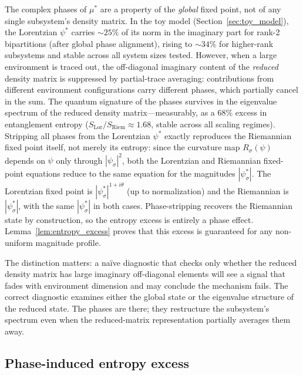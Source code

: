 \documentclass[12pt,a4paper]{article}
\theoremstyle{definition}
\theoremstyle{remark}
\begin{document}
The complex phases of $\mu^*$ are a property of the \emph{global}
fixed point, not of any single subsystem's density matrix. In the toy
model (Section~\ref{sec:toy_model}), the Lorentzian $\psi^*$ carries
$\sim 25\%$ of its norm in the imaginary part for rank-2 bipartitions
(after global phase alignment), rising to $\sim 34\%$ for higher-rank
subsystems and stable across all system sizes tested. However, when a
large environment is traced out, the off-diagonal imaginary content of
the \emph{reduced} density matrix is suppressed by partial-trace
averaging: contributions from different environment configurations
carry different phases, which partially cancel in the sum. The quantum
signature of the phases survives in the eigenvalue spectrum of the
reduced density matrix---measurably, as a $68\%$ excess in entanglement
entropy ($S_{\mathrm{Lor}} / S_{\mathrm{Riem}} \approx 1.68$, stable
across all scaling regimes). Stripping all phases from the Lorentzian
$\psi^*$ exactly reproduces the Riemannian fixed point itself, not
merely its entropy: since the curvature map $R_\sigma(\psi)$ depends
on $\psi$ only through $|\psi_\sigma|^2$, both the Lorentzian and
Riemannian fixed-point equations reduce to the same equation for the
magnitudes $|\psi^*_\sigma|$. The Lorentzian fixed point is
$|\psi^*_\sigma|^{1+i\theta}$ (up to normalization) and the Riemannian
is $|\psi^*_\sigma|$, with the same $|\psi^*_\sigma|$ in both cases.
Phase-stripping recovers the Riemannian state by construction, so the
entropy excess is entirely a phase effect.
Lemma~\ref{lem:entropy_excess} proves that this excess is guaranteed
for any non-uniform magnitude profile.

The distinction matters: a na\"ive diagnostic that checks only whether
the reduced density matrix has large imaginary off-diagonal elements
will see a signal that fades with environment dimension and may conclude
the mechanism fails. The correct diagnostic examines either the global
state or the eigenvalue structure of the reduced state. The phases are
there; they restructure the subsystem's spectrum even when the
reduced-matrix representation partially averages them away.

\subsection{Phase-induced entropy excess}
\label{sec:entropy_excess}
\end{document}
